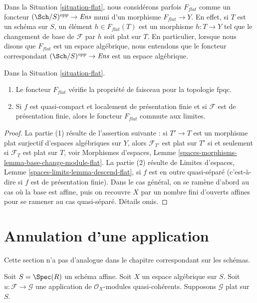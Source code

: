 \noindent
Dans la Situation \ref{situation-flat}, nous considérons parfois $F_{flat}$ comme un foncteur
$(\Sch/S)^{opp} \to \textit{Ens}$ muni d'un morphisme
$F_{flat} \to Y$. En effet, si $T$ est un schéma sur $S$,
un élément $h \in F_{flat}(T)$ est un morphisme $h : T \to Y$
tel que le changement de base de $\mathcal{F}$ par $h$ soit plat sur $T$.
En particulier, lorsque nous disons
que $F_{flat}$ est un espace algébrique, nous entendons que le foncteur
correspondant $(\Sch/S)^{opp} \to \textit{Ens}$ est un espace algébrique.

\begin{lemma}
\label{lemma-flat}
Dans la Situation \ref{situation-flat}.
\begin{enumerate}
\item Le foncteur $F_{flat}$ vérifie la propriété de faisceau pour la topologie fpqc.
\item Si $f$ est quasi-compact et localement de présentation finie
et si $\mathcal{F}$ est de présentation finie, alors le foncteur
$F_{flat}$ commute aux limites.
\end{enumerate}
\end{lemma}

\begin{proof}
La partie (1) résulte de l'assertion suivante : si $T' \to T$ est un morphisme
plat surjectif d'espaces algébriques sur $Y$, alors
$\mathcal{F}_{T'}$ est plat sur $T'$ si et seulement si
$\mathcal{F}_T$ est plat sur $T$, voir
Morphismes d'espaces, Lemme \ref{spaces-morphisms-lemma-base-change-module-flat}.
La partie (2) résulte de
Limites d'espaces, Lemme \ref{spaces-limits-lemma-descend-flat},
si $f$ est en outre quasi-séparé (c'est-à-dire si $f$ est de présentation finie).
Dans le cas général, on se ramène d'abord au cas où la
base est affine, puis on recouvre $X$ par un nombre fini d'ouverts affines
pour se ramener au cas quasi-séparé. Détails omis.
\end{proof}










\section{Annulation d'une application}
\label{section-zero-map}

\noindent
Cette section n'a pas d'analogue dans le chapitre correspondant sur les schémas.

\begin{situation}
\label{situation-somewhat-closed}
Soit $S = \Spec(R)$ un schéma affine. Soit $X$ un espace algébrique sur
$S$. Soit $u : \mathcal{F} \to \mathcal{G}$ une application de
$\mathcal{O}_X$-modules quasi-cohérents. Supposons $\mathcal{G}$ plat sur $S$.
\end{situation}

